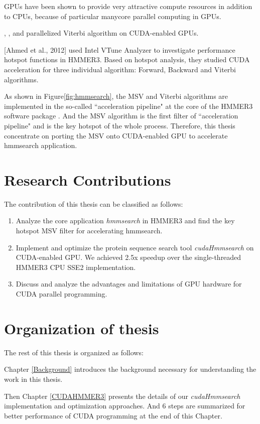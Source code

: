 GPUs have been shown to provide very attractive compute resources in addition to CPUs, because of particular manycore parallel computing in GPUs.

\citep{GPUHMM}, \citep{Ganesan}, \citep{Du} and \citep{Quirem} parallelized Viterbi algorithm on CUDA-enabled GPUs.

[Ahmed et al., 2012]\citep{Ahmed} used Intel VTune Analyzer \citep{Intel} to investigate performance hotspot functions in HMMER3. Based on hotspot analysis, they studied CUDA acceleration for three individual algorithm: Forward, Backward and Viterbi algorithms.

As shown in Figure\ref{fig:hmmsearch}, the MSV and Viterbi algorithms are implemented in the so-called ``acceleration pipeline" at the core of the HMMER3 software package \citep{HMMER3}. And the MSV algorithm is the first filter of ``acceleration pipeline" and is the key hotspot of the whole process. Therefore, this thesis concentrate on porting the MSV onto CUDA-enabled GPU to accelerate hmmsearch application.

\section{Research Contributions}
The contribution of this thesis can be classified as follows:
\begin{enumerate}
 \item Analyze the core application \emph{hmmsearch} in HMMER3 and find the key hotspot MSV filter for accelerating hmmsearch.
 \item Implement and optimize the protein sequence search tool \emph{cudaHmmsearch} on CUDA-enabled GPU. We achieved 2.5x speedup over the single-threaded HMMER3 CPU SSE2 implementation.
 \item Discuss and analyze the advantages and limitations of GPU hardware for CUDA parallel programming.
\end{enumerate}

\section{Organization of thesis}
The rest of this thesis is organized as follows:

Chapter \ref{Background} introduces the background necessary for understanding the work in this thesis.

Then Chapter \ref{CUDAHMMER3} presents the details of our \emph{cudaHmmsearch} implementation and optimization approaches. And 6 steps are summarized for better performance of CUDA programming at the end of this Chapter.

